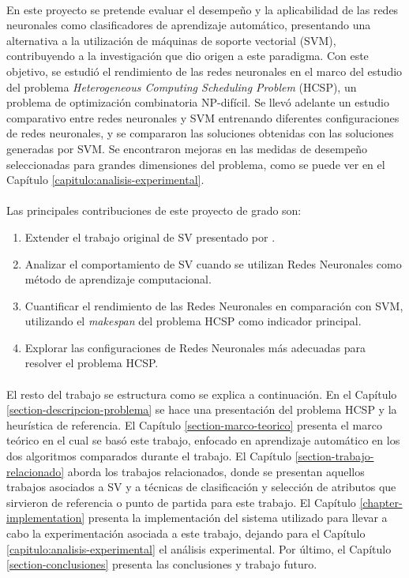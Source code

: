 \paragraph{} En este proyecto se pretende evaluar el desempeño y la aplicabilidad de las redes neuronales como clasificadores de aprendizaje automático, presentando una alternativa a la utilización de máquinas de soporte vectorial (SVM), contribuyendo a la investigación que dio origen a este paradigma.
Con este objetivo, se estudió el rendimiento de las redes neuronales en el marco del estudio del problema \textit{Heterogeneous Computing Scheduling Problem} (HCSP), un problema de optimización combinatoria NP-difícil.
Se llevó adelante un estudio comparativo entre redes neuronales y SVM entrenando diferentes configuraciones de redes neuronales, y se compararon las soluciones obtenidas con las soluciones generadas por SVM. Se encontraron mejoras en las medidas de desempeño seleccionadas para grandes dimensiones del problema, como se puede ver en el Capítulo \ref{capitulo:analisis-experimental}.

\paragraph{}Las principales contribuciones de este proyecto de grado son:
\begin{enumerate}
    \item Extender el trabajo original de SV presentado por \citet{savant-original}.
    \item Analizar el comportamiento de SV cuando se utilizan Redes Neuronales como método de aprendizaje computacional.
    \item Cuantificar el rendimiento de las Redes Neuronales en comparación con SVM, utilizando el \textit{makespan} del problema HCSP como indicador principal.
    \item Explorar las configuraciones de Redes Neuronales más adecuadas para resolver el problema HCSP.
\end{enumerate}

\paragraph{} El resto del trabajo se estructura como se explica a continuación.
En el Capítulo \ref{section-descripcion-problema} se hace una presentación del problema HCSP y la heurística de referencia. El Capítulo \ref{section-marco-teorico} presenta el marco teórico en el cual se basó este trabajo, enfocado en aprendizaje automático en los dos algoritmos comparados durante el trabajo.
El Capítulo \ref{section-trabajo-relacionado} aborda los trabajos relacionados, donde se presentan aquellos trabajos asociados a SV y a técnicas de clasificación y selección de atributos que sirvieron de referencia o punto de partida para este trabajo.
El Capítulo \ref{chapter-implementation} presenta la implementación del sistema utilizado para llevar a cabo la experimentación asociada a este trabajo, dejando para el Capítulo \ref{capitulo:analisis-experimental} el análisis experimental.
Por último, el Capítulo \ref{section-conclusiones} presenta las conclusiones y trabajo futuro.
